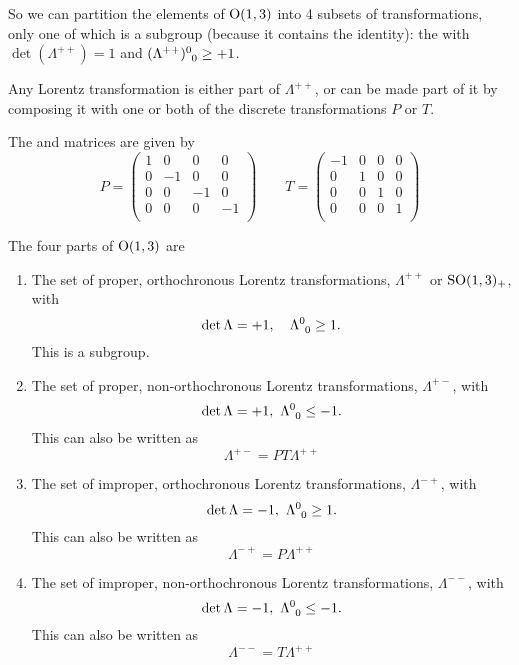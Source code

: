 So we can partition the elements of $\operatorname{O}(1,3)$ into 4 subsets of transformations, only one of which is a subgroup (because it contains the identity): the  with $\det(\Lambda^{++}) = 1$ and $\tensor{(\Lambda^{++})}{^0_0} \geq +1$.

Any Lorentz transformation is either part of $\Lambda^{++}$, or can be made part of it by composing it with one or both of the discrete transformations $P$ or $T$.

The  and  matrices are given by
\[ P = \begin{pmatrix}
1 & 0 & 0 & 0 \\
0 & -1 & 0 & 0 \\
0 & 0 & -1 & 0 \\
0 & 0 & 0 & -1 \\
\end{pmatrix} \qquad T = \begin{pmatrix}
-1 & 0 & 0 & 0 \\
0 & 1 & 0 & 0 \\
0 & 0 & 1 & 0 \\
0 & 0 & 0 & 1 \\
\end{pmatrix} \]

The four parts of $\operatorname{O}(1,3)$ are
\begin{enumerate}
\item The set of proper, orthochronous Lorentz transformations, $\Lambda^{++}$ or $\operatorname{SO}(1,3)_+$, with 
\[\det\Lambda = +1, \quad \tensor{\Lambda}{^0_0}\geq 1.\]
This is a subgroup.
\item The set of proper, non-orthochronous Lorentz transformations, $\Lambda^{+-}$, with 
\[\det\Lambda = +1, \ \tensor{\Lambda}{^0_0}\leq -1. \]
This can also be written as
\[ \Lambda^{+-} = PT\Lambda^{++} \]
\item The set of improper, orthochronous Lorentz transformations, $\Lambda^{-+}$, with 
\[\det\Lambda = -1, \ \tensor{\Lambda}{^0_0}\geq 1. \]
This can also be written as
\[ \Lambda^{-+} = P\Lambda^{++} \]
\item The set of improper, non-orthochronous Lorentz transformations, $\Lambda^{--}$, with 
\[\det\Lambda = -1, \ \tensor{\Lambda}{^0_0}\leq -1. \]
This can also be written as
\[ \Lambda^{--} = T\Lambda^{++} \]
\end{enumerate}

